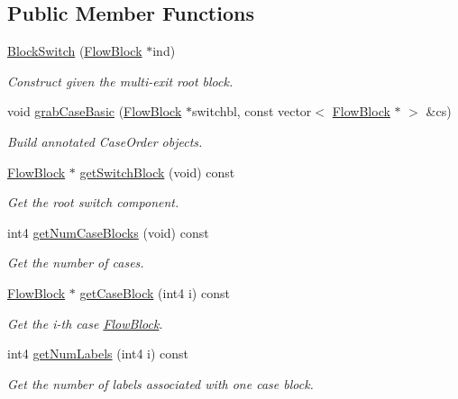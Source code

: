 \subsection*{Public Member Functions}
\begin{DoxyCompactItemize}
\item 
\mbox{\hyperlink{class_block_switch_a9c8ea8ab5e05fa4b6c9244cac89cf5cf}{Block\+Switch}} (\mbox{\hyperlink{class_flow_block}{Flow\+Block}} $\ast$ind)
\begin{DoxyCompactList}\small\item\em Construct given the multi-\/exit root block. \end{DoxyCompactList}\item 
void \mbox{\hyperlink{class_block_switch_ab6767a24f3c49d93a880e101ccef4b7f}{grab\+Case\+Basic}} (\mbox{\hyperlink{class_flow_block}{Flow\+Block}} $\ast$switchbl, const vector$<$ \mbox{\hyperlink{class_flow_block}{Flow\+Block}} $\ast$ $>$ \&cs)
\begin{DoxyCompactList}\small\item\em Build annotated Case\+Order objects. \end{DoxyCompactList}\item 
\mbox{\hyperlink{class_flow_block}{Flow\+Block}} $\ast$ \mbox{\hyperlink{class_block_switch_aa1e2e28b18779bc98c41ec5925d29baf}{get\+Switch\+Block}} (void) const
\begin{DoxyCompactList}\small\item\em Get the root switch component. \end{DoxyCompactList}\item 
int4 \mbox{\hyperlink{class_block_switch_aabd55152ee939db1ac6c46e7493f26e1}{get\+Num\+Case\+Blocks}} (void) const
\begin{DoxyCompactList}\small\item\em Get the number of cases. \end{DoxyCompactList}\item 
\mbox{\hyperlink{class_flow_block}{Flow\+Block}} $\ast$ \mbox{\hyperlink{class_block_switch_a60c08166b6f3ae7c4ed03d622a843fc6}{get\+Case\+Block}} (int4 i) const
\begin{DoxyCompactList}\small\item\em Get the i-\/th {\itshape case} \mbox{\hyperlink{class_flow_block}{Flow\+Block}}. \end{DoxyCompactList}\item 
int4 \mbox{\hyperlink{class_block_switch_af7731cebe7c26c9de45a45b0f821738a}{get\+Num\+Labels}} (int4 i) const
\begin{DoxyCompactList}\small\item\em Get the number of labels associated with one {\itshape case} block. \end{DoxyCompactList}\item 

\end{DoxyCompactItemize}
